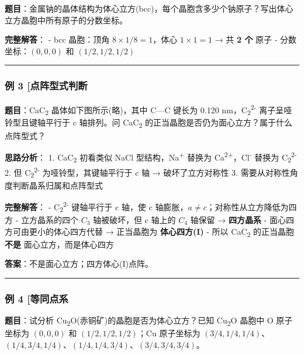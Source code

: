 \textbf{题目}：金属钠的晶体结构为体心立方(bcc)，每个晶胞含多少个钠原子？写出体心立方晶胞中所有原子的分数坐标。

\textbf{完整解答}：
- bcc 晶胞：顶角 \(8 \times 1/8 = 1\)，体心 \(1 \times 1 = 1\) → 共 \textbf{2 个} 原子
- 分数坐标：\((0, 0, 0)\) 和 \((1/2, 1/2, 1/2)\)

\begin{center}\rule{0.5\linewidth}{0.5pt}\end{center}

\subsubsection{例 3 {[}点阵型式判断}\label{ux4f8b-3-ux70b9ux9635ux578bux5f0fux5224ux65ad}

\textbf{题目}：CaC\textsubscript{2} 晶体如下图所示(略)，其中 C---C 键长为 0.120 nm，C\textsubscript{2}\textsuperscript{2-} 离子呈哑铃型且键轴平行于 c 轴排列。问 CaC\textsubscript{2} 的正当晶胞是否仍为面心立方？属于什么点阵型式？

\textbf{思路分析}：
1. CaC\textsubscript{2} 初看类似 NaCl 型结构，Na\textsuperscript{+} 替换为 Ca\textsuperscript{2+}，Cl\textsuperscript{-} 替换为 C\textsubscript{2}\textsuperscript{2-}
2. 但 C\textsubscript{2}\textsuperscript{2-} 为哑铃型，其键轴平行于 c 轴 → 破坏了立方对称性
3. 需要从对称性角度判断晶系归属和点阵型式

\textbf{完整解答}：
- C\textsubscript{2}\textsuperscript{2-} 键轴平行于 c 轴，使 c 轴膨胀，\(a \neq c\)；对称性从立方降低为四方
- 立方晶系的四个 \(C_3\) 轴被破坏，但 c 轴上的 \(C_4\) 轴保留 → \textbf{四方晶系}
- 面心四方可由更小的体心四方代替 → 正当晶胞为 \textbf{体心四方(I)}
- 所以 CaC\textsubscript{2} 的正当晶胞 \textbf{不是} 面心立方，而是体心四方

\textbf{答案}：不是面心立方；四方体心(I)点阵。

\begin{center}\rule{0.5\linewidth}{0.5pt}\end{center}

\subsubsection{例 4 {[}等同点系}\label{ux4f8b-4-ux7b49ux540cux70b9ux7cfb}

\textbf{题目}：试分析 Cu\textsubscript{2}O(赤铜矿)的晶胞是否为体心立方？已知 Cu\textsubscript{2}O 晶胞中 O 原子坐标为 \((0, 0, 0)\) 和 \((1/2, 1/2, 1/2)\)；Cu 原子坐标为 \((3/4, 1/4, 1/4)\)、\((1/4, 3/4, 1/4)\)、\((1/4, 1/4, 3/4)\)、\((3/4, 3/4, 3/4)\)。

